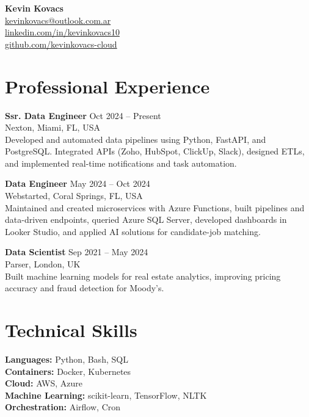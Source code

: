 \documentclass[10pt]{article}
\begin{document}
\begin{center}
    {\large \textbf{Kevin Kovacs}}\\
    \href{mailto:kevinkovacs@outlook.com.ar}{kevinkovacs@outlook.com.ar} \\
    \href{https://www.linkedin.com/in/kevinkovacs10}{linkedin.com/in/kevinkovacs10} \\
    \href{https://github.com/kevinkovacs-cloud}{github.com/kevinkovacs-cloud}
\end{center}



\section*{Professional Experience}
\textbf{Ssr. Data Engineer} \hfill Oct 2024 -- Present\\
Nexton, Miami, FL, USA\\
Developed and automated data pipelines using Python, FastAPI, and PostgreSQL. Integrated APIs (Zoho, HubSpot, ClickUp, Slack), designed ETLs, and implemented real-time notifications and task automation. 

\vspace{1mm}

\textbf{Data Engineer} \hfill May 2024 -- Oct 2024\\
Webstarted, Coral Springs, FL, USA\\
Maintained and created microservices with Azure Functions, built pipelines and data-driven endpoints, queried Azure SQL Server, developed dashboards in Looker Studio, and applied AI solutions for candidate-job matching.

\vspace{1mm}

\textbf{Data Scientist} \hfill Sep 2021 -- May 2024\\
Parser, London, UK\\
Built machine learning models for real estate analytics, improving pricing accuracy and fraud detection for Moody's.

\section*{Technical Skills}
\textbf{Languages:} Python, Bash, SQL \\
\textbf{Containers:} Docker, Kubernetes \\
\textbf{Cloud:} AWS, Azure \\
\textbf{Machine Learning:} scikit-learn, TensorFlow, NLTK \\
\textbf{Orchestration:} Airflow, Cron
\end{document}
